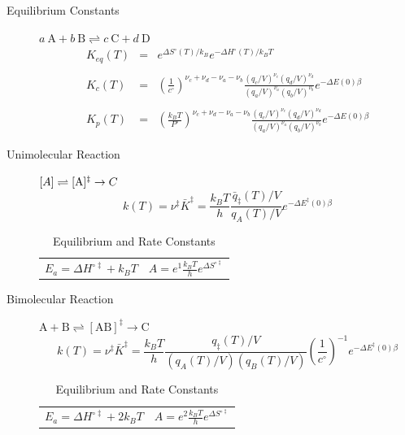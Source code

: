 \documentclass[11pt]{article}
\begin{document}
\begin{table}
\begin{center}
    \caption{\large{Equilibrium and Rate Constants}}
   \begin{description}
   \item[Equilibrium Constants] $a~\text{A} + b~\text{B} \rightleftharpoons c~\text{C} + d~\text{D} $
     \begin{eqnarray*}
       K_{eq}(T) &=& e^{\Delta S^\circ(T)/k_B}e^{-\Delta H^\circ(T)/k_BT}
       \\ \\
            K_c(T) &=&
          \left(\frac{1}{c^\circ}\right)^{\nu_c+\nu_d-\nu_a-\nu_b}\frac{(q_c/V)^{\nu_c}(q_d/V)^{\nu_d}}{(q_a/V)^{\nu_a}(q_b/V)^{\nu_b}}e^{-\Delta
            E(0)\beta}\\ \\
            K_p(T) &=&
          \left(\frac{k_BT}{P^\circ}\right)^{\nu_c+\nu_d-\nu_a-\nu_b}\frac{(q_c/V)^{\nu_c}(q_d/V)^{\nu_d}}{(q_a/V)^{\nu_a}(q_b/V)^{\nu_b}}e^{-\Delta
            E(0)\beta}
\end{eqnarray*}
\item[Unimolecular Reaction] $\text[A] \rightleftharpoons [\text{A} ]^\ddagger
  \rightarrow C$
      \begin{displaymath}
        k(T)=\nu^\ddagger \bar K^\ddagger=\frac{k_B T}{h} \frac{\bar{q}_\ddagger(T)/V}{q_A(T)/V}
          e^{-\Delta E^\ddagger(0)\beta}
      \end{displaymath}
\begin{center}
      \begin{tabular}{cc}
      $ \displaystyle E_a =\Delta H^{\circ\ddagger}+k_B T $
      & $ \displaystyle A = e^1\frac{k_B T}{h} e^{\Delta S^{\circ\ddagger}} $
      \end{tabular}
\end{center}
\item[Bimolecular Reaction] $
        \mathrm{A} + \mathrm{B} \rightleftharpoons [ \mathrm{AB}]^\ddagger
        \rightarrow \text{C}$
      \begin{displaymath}
        k(T)=\nu^\ddagger \bar K^\ddagger=\frac{k_B T}{h} \frac{q_\ddagger(T)/V}{(q_A(T)/V)(q_B(T)/V)}\left
          (\frac{1}{c^\circ}\right )^{-1}
        e^{-\Delta E^\ddagger(0)\beta}
      \end{displaymath}
      \begin{center}
        \begin{tabular}{cc}
        $ \displaystyle E_a  =\Delta H^{\circ\ddagger}+2 k_B T $ & $ \displaystyle
        A  = e^2\frac{k_B T}{h} e^{\Delta S^{\circ\ddagger}} $
      \end{tabular}
      \end{center}
   \end{description}
 \end{center}
 \end{table}
\end{document}
